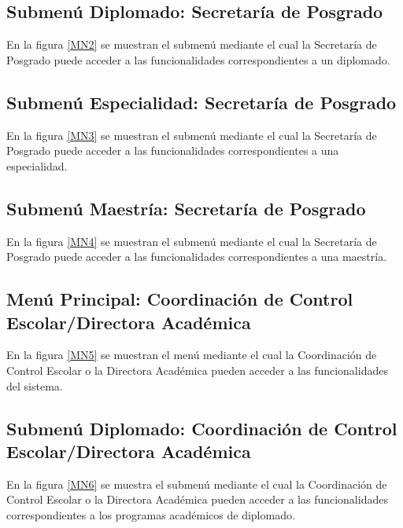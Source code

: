 \hypertarget{submenu:SP-MenuDiplomado}{}	
\subsection{Submenú Diplomado: Secretaría de Posgrado}
En la figura \ref{MN2} se muestran el submenú mediante el cual la Secretaría de Posgrado puede acceder a las funcionalidades correspondientes a un diplomado.

\hypertarget{submenu:SP-MenuEspecialidad}{}	
\subsection{Submenú Especialidad: Secretaría de Posgrado}
En la figura \ref{MN3} se muestran el submenú mediante el cual la Secretaría de Posgrado puede acceder a las funcionalidades correspondientes a una especialidad.

\hypertarget{submenu:SP-MenuMaestria}{}	
\subsection{Submenú Maestría: Secretaría de Posgrado}
En la figura \ref{MN4} se muestran el submenú mediante el cual la Secretaría de Posgrado puede acceder a las funcionalidades correspondientes a una maestría.

\hypertarget{menu:CCE-MenuEA}{}	
\subsection{Menú Principal: Coordinación de Control Escolar/Directora Académica}
En la figura \ref{MN5} se muestran el menú mediante el cual la Coordinación de Control Escolar o la Directora Académica pueden acceder a las funcionalidades del sistema.

\hypertarget{submenu:CCE-MenuDiplomado}{}	
\subsection{Submenú Diplomado: Coordinación de Control Escolar/Directora Académica}
En la figura \ref{MN6} se muestra el submenú mediante el cual la Coordinación de Control Escolar o la Directora Académica pueden acceder a las funcionalidades correspondientes a los programas académicos de diplomado.


